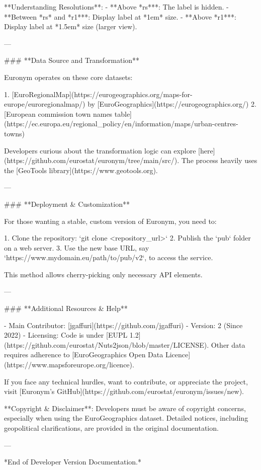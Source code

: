 **Understanding Resolutions**:
- **Above *rs***: The label is hidden.
- **Between *rs* and *r1***: Display label at *1em* size.
- **Above *r1***: Display label at *1.5em* size (larger view).

---

### **Data Source and Transformation**

Euronym operates on these core datasets:

1. [EuroRegionalMap](https://eurogeographics.org/maps-for-europe/euroregionalmap/) by [EuroGeographics](https://eurogeographics.org/)
2. [European commission town names table](https://ec.europa.eu/regional_policy/en/information/maps/urban-centres-towns)

Developers curious about the transformation logic can explore [here](https://github.com/eurostat/euronym/tree/main/src/). The process heavily uses the [GeoTools library](https://www.geotools.org).

---

### **Deployment & Customization**

For those wanting a stable, custom version of Euronym, you need to:

1. Clone the repository: `git clone <repository_url>`
2. Publish the `pub` folder on a web server.
3. Use the new base URL, say `https://www.mydomain.eu/path/to/pub/v2`, to access the service.

This method allows cherry-picking only necessary API elements.

---

### **Additional Resources & Help**

- Main Contributor: [jgaffuri](https://github.com/jgaffuri)
- Version: 2 (Since 2022)
- Licensing: Code is under [EUPL 1.2](https://github.com/eurostat/Nuts2json/blob/master/LICENSE). Other data requires adherence to [EuroGeographics Open Data Licence](https://www.mapsforeurope.org/licence).

If you face any technical hurdles, want to contribute, or appreciate the project, visit [Euronym's GitHub](https://github.com/eurostat/euronym/issues/new).

**Copyright & Disclaimer**: Developers must be aware of copyright concerns, especially when using the EuroGeographics dataset. Detailed notices, including geopolitical clarifications, are provided in the original documentation.

---

*End of Developer Version Documentation.*